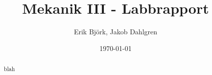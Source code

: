 \documentclass[12pt,a4paper]{article}
\title{Mekanik III - Labbrapport}
\author{Erik Björk, Jakob Dahlgren}
\date{\today}
\begin{document}
\maketitle
\clearpage

\tableofcontents

\begin{abstract}
    blah
\end{abstract}







\printbibliography
\appendix
%
\end{document}
